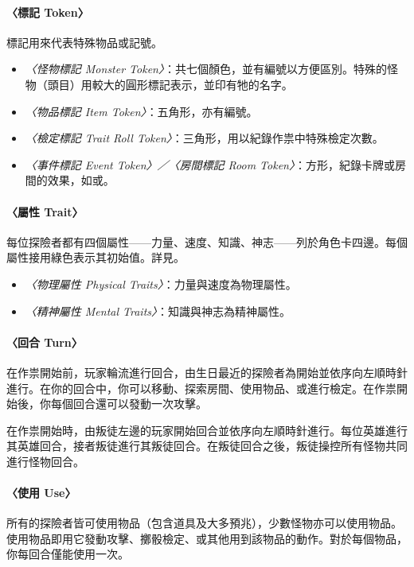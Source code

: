 \paragraph{〈標記 Token〉}
標記用來代表特殊物品或記號。

\begin{itemize}
  \item \textit{〈怪物標記 Monster Token〉}：共七個顏色，並有編號以方便區別。特殊的怪物（頭目）用較大的圓形標記表示，並印有牠的名字。
  \item \textit{〈物品標記 Item Token〉}：五角形，亦有編號。
  \item \textit{〈檢定標記 Trait Roll Token〉}：三角形，用以紀錄作祟中特殊檢定次數。
  \item \textit{〈事件標記 Event Token〉／〈房間標記 Room Token〉}：方形，紀錄卡牌或房間的效果，如或。
\end{itemize}

\paragraph{〈屬性 Trait〉}
每位探險者都有四個屬性——力量、速度、知識、神志——列於角色卡四邊。每個屬性接用綠色表示其初始值。詳見。

\begin{itemize}
  \item \textit{〈物理屬性 Physical Traits〉}：力量與速度為物理屬性。
  \item \textit{〈精神屬性 Mental Traits〉}：知識與神志為精神屬性。
\end{itemize}

\paragraph{〈回合 Turn〉}
在作祟開始前，玩家輪流進行回合，由生日最近的探險者為開始並依序向左順時針進行。在你的回合中，你可以移動、探索房間、使用物品、或進行檢定。在作祟開始後，你每個回合還可以發動一次攻擊。

在作祟開始時，由叛徒左邊的玩家開始回合並依序向左順時針進行。每位英雄進行其英雄回合，接者叛徒進行其叛徒回合。在叛徒回合之後，叛徒操控所有怪物共同進行怪物回合。

\paragraph{〈使用 Use〉}
所有的探險者皆可使用物品（包含道具及大多預兆），少數怪物亦可以使用物品。使用物品即用它發動攻擊、擲骰檢定、或其他用到該物品的動作。對於每個物品，你每回合僅能使用一次。

